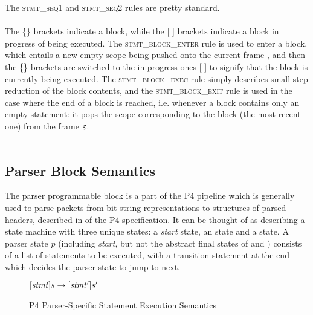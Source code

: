 \documentclass[UTF8]{article}
\begin{document}
The \textsc{stmt\_seq1} and \textsc{stmt\_seq2} rules are pretty standard.
\\~\\
The \{\} brackets indicate a block, while the [ ] brackets indicate a block in progress of being executed.
The \textsc{stmt\_block\_enter} rule is used to enter a block, which entails a new empty scope \escope{} being pushed onto the current frame \currsf{}, and then the \{\} brackets are switched to the in-progress ones [ ] to signify that the block is currently being executed. The \textsc{stmt\_block\_exec} rule simply describes small-step reduction of the block contents, and the \textsc{stmt\_block\_exit} rule is used in the case where the end of a block is reached, i.e. whenever a block contains only an empty statement: it pops the scope corresponding to the block (the most recent one) from the frame $\varepsilon$.
\\~\\

\newcommand{\start}{\textit{start}}
\subsection{Parser Block Semantics}
The parser programmable block is a part of the P4 pipeline which is generally used to parse packets from bit-string representations to structures of parsed headers, described in  of the P4 specification. It can be thought of as describing a state machine with three unique states: a \start{} state, an \accept{} state and a \reject{\msg{}} state. A parser state $p$ (including \start{}, but not the abstract final states of \accept{} and \reject{\msg{}}) consists of a list of statements to be executed, with a transition statement at the end which decides the parser state to jump to next.

\begin{figure}[ht!]
\begin{ottdefnblock}{$[  \mathit{stmt}  ]  s  \rightarrow  [  \mathit{stmt'}  ]  s'$}{}
\ottusedrule{\ottdrulestmtXXverifyXXThree{}}
\ottusedrule{\ottdrulestmtXXverifyXXFour{}}
\ottusedrule{\ottdrulestmtXXtransXXOne{}}
\ottusedrule{\ottdrulestmtXXtransXXTwo{}}
\ottusedrule{\ottdrulestmtXXtransXXThree{}}
\end{ottdefnblock}
\caption{P4 Parser-Specific Statement Execution Semantics}
\label{fig:parssemstmtexec}
\end{figure}
\end{document}

